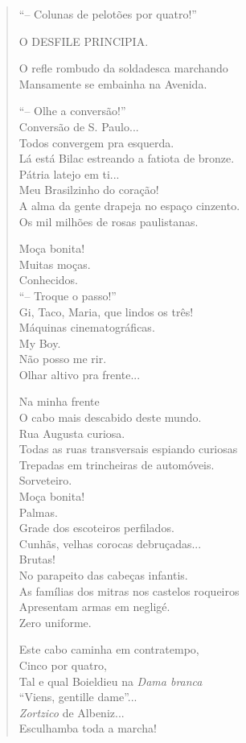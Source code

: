 \begin{verse} %
``-- Colunas de pelotões por quatro!''

O DESFILE PRINCIPIA.

O refle rombudo da soldadesca marchando\\
Mansamente se embainha na Avenida.

``-- Olhe a conversão!''\\
Conversão de S. Paulo...\\
Todos convergem pra esquerda.\\
Lá está Bilac estreando a fatiota de bronze.\\
Pátria latejo em ti...\\
Meu Brasilzinho do coração!\\
A alma da gente drapeja no espaço cinzento.\\
Os mil milhões de rosas paulistanas.

Moça bonita!\\
Muitas moças.\\
Conhecidos.\\
``-- Troque o passo!''\\
Gi, Taco, Maria, que lindos os três!\\
Máquinas cinematográficas.\\
My Boy.\\
Não posso me rir.\\
Olhar altivo pra frente...

Na minha frente\\
O cabo mais descabido deste mundo.\\
Rua Augusta curiosa.\\
Todas as ruas transversais espiando curiosas\\
Trepadas em trincheiras de automóveis.\\
Sorveteiro.\\
Moça bonita!\\
Palmas.\\
Grade dos escoteiros perfilados.\\
Cunhãs, velhas corocas debruçadas...\\
Brutas!\\
No parapeito das cabeças infantis.\\
As famílias dos mitras nos castelos roqueiros\\
Apresentam armas em negligé.\\
Zero uniforme.

Este cabo caminha em contratempo,\\
Cinco por quatro,\\
Tal e qual Boieldieu na \emph{Dama branca}\\
``Viens, gentille dame''...\\
\emph{Zortzico} de Albeniz...\\
Esculhamba toda a marcha!


\end{verse}

